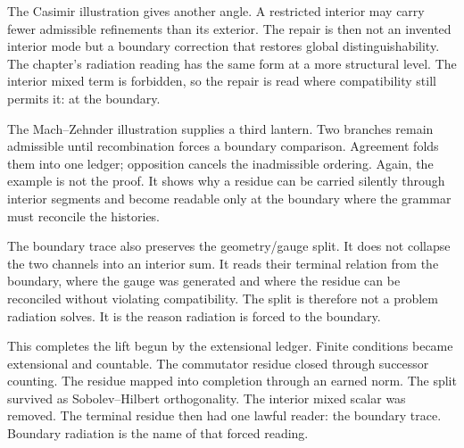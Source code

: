 The Casimir illustration gives another angle. A restricted interior may
carry fewer admissible refinements than its exterior. The repair is then not
an invented interior mode but a boundary correction that restores global
distinguishability. The chapter's radiation reading has the same form at a
more structural level. The interior mixed term is forbidden, so the repair
is read where compatibility still permits it: at the boundary.

The Mach--Zehnder illustration supplies a third lantern. Two branches remain
admissible until recombination forces a boundary comparison. Agreement
folds them into one ledger; opposition cancels the inadmissible ordering.
Again, the example is not the proof. It shows why a residue can be carried
silently through interior segments and become readable only at the boundary
where the grammar must reconcile the histories.

The boundary trace also preserves the geometry/gauge split. It does not
collapse the two channels into an interior sum. It reads their terminal
relation from the boundary, where the gauge was generated and where the
residue can be reconciled without violating compatibility. The split is
therefore not a problem radiation solves. It is the reason radiation is
forced to the boundary.

This completes the lift begun by the extensional ledger. Finite conditions
became extensional and countable. The commutator residue closed through
successor counting. The residue mapped into completion through an earned
norm. The split survived as Sobolev--Hilbert orthogonality. The interior
mixed scalar was removed. The terminal residue then had one lawful reader:
the boundary trace. Boundary radiation is the name of that forced reading.
